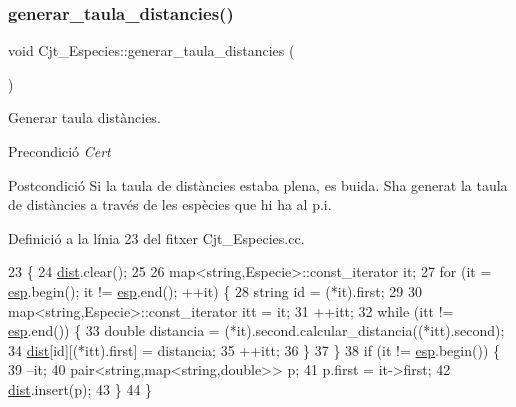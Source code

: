 \subsubsection{\texorpdfstring{generar\+\_\+taula\+\_\+distancies()}{generar\_taula\_distancies()}}
{\footnotesize\ttfamily void Cjt\+\_\+\+Especies\+::generar\+\_\+taula\+\_\+distancies (\begin{DoxyParamCaption}{ }\end{DoxyParamCaption})\hspace{0.3cm}{\ttfamily [private]}}



Generar taula distàncies. 

\begin{DoxyPrecond}{Precondició}
{\itshape Cert} 
\end{DoxyPrecond}
\begin{DoxyPostcond}{Postcondició}
Si la taula de distàncies estaba plena, es buida. S\textquotesingle{}ha generat la taula de distàncies a través de les espècies que hi ha al p.\+i. 
\end{DoxyPostcond}


Definició a la línia 23 del fitxer Cjt\+\_\+\+Especies.\+cc.


\begin{DoxyCode}
23                                             \{
24     \hyperlink{class_cjt___especies_aaf5d15b706e8b0c5b910283d60ef58a6}{dist}.clear();
25     
26     map<string,Especie>::const\_iterator it;
27     \textcolor{keywordflow}{for} (it = \hyperlink{class_cjt___especies_aa232ab8543b78ea6d8ecaa1e5f9ccef5}{esp}.begin(); it != \hyperlink{class_cjt___especies_aa232ab8543b78ea6d8ecaa1e5f9ccef5}{esp}.end(); ++it) \{
28         \textcolor{keywordtype}{string} \textcolor{keywordtype}{id} = (*it).first;
29         
30         map<string,Especie>::const\_iterator itt = it;
31         ++itt;
32         \textcolor{keywordflow}{while} (itt != \hyperlink{class_cjt___especies_aa232ab8543b78ea6d8ecaa1e5f9ccef5}{esp}.end()) \{
33             \textcolor{keywordtype}{double} distancia = (*it).second.calcular\_distancia((*itt).second);            
34             \hyperlink{class_cjt___especies_aaf5d15b706e8b0c5b910283d60ef58a6}{dist}[id][(*itt).first] = distancia;
35             ++itt;
36         \}
37     \}
38     \textcolor{keywordflow}{if} (it != \hyperlink{class_cjt___especies_aa232ab8543b78ea6d8ecaa1e5f9ccef5}{esp}.begin()) \{
39         --it;
40         pair<string,map<string,double>> p;
41         p.first = it->first;
42         \hyperlink{class_cjt___especies_aaf5d15b706e8b0c5b910283d60ef58a6}{dist}.insert(p);
43     \}
44 \}
\end{DoxyCode}
\mbox{\label{class_cjt___especies_aed10769d0831e7b92fb0a602bce7766a}} 
